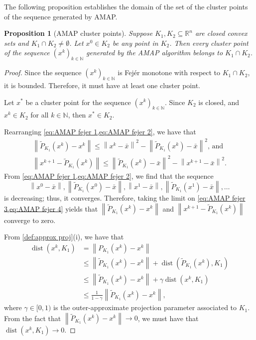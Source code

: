 \documentclass[smallextended,numbook,nospthms]{svjour3}
\theoremstyle{plain}
\newtheorem{proposition}[theorem]{Proposition}
\theoremstyle{definition}
\def\RR{\mathds R}
\def\NN{\mathds N}
\DeclareMathOperator{\dist}{dist}
\begin{document}
The following proposition establishes the domain of the set of the cluster points of the sequence generated by AMAP.
\begin{proposition}[AMAP cluster points]\label{prop:AMAP cluster}
	Suppose $K_{1},K_{2} \subseteq \RR^{n}$ are closed convex sets and $K_{1} \cap K_{2} \neq \emptyset$. Let $x^{0} \in K_{2}$ be any point in $K_{2}$. Then every cluster point of the sequence $\left(x^{k}\right)_{k \in \NN}$ generated by the AMAP algorithm belongs to $K_{1} \cap K_{2}$.
\end{proposition}
	\begin{proof}
	Since the sequence $\left(x^{k}\right)_{k \in \NN}$ is Fejér monotone with respect to $K_{1} \cap K_{2}$, it is bounded. Therefore, it must have at least one cluster point.
	
	Let $x^{*}$ be a cluster point for the sequence $\left(x^{k}\right)_{k \in \NN}$. Since $K_{2}$ is closed, and $x^{k} \in K_{2}$ for all $k \in \NN$, then $x^{*} \in K_{2}$.
	
	Rearranging \cref{eq:AMAP fejer 1,eq:AMAP fejer 2}, we have that
	\begin{align}
	\left\|\tilde{P}_{K_{1}}\left(x^{k}\right)-x^{k}\right\| \leq  \left\|x^{k}-\bar{x}\right\|^{2} - \left\|\tilde{P}_{K_{1}}\left(x^{k}\right)-\bar{x}\right\|^{2} \label{eq:AMAP fejer 3} \text{, and} \\
	\left\|x^{k+1}-\tilde{P}_{K_{1}}\left(x^{k}\right)\right\| \leq \left\|\tilde{P}_{K_{1}}\left(x^{k}\right)-\bar{x}\right\|^{2} - \left\|x^{k+1}-\bar{x}\right\|^{2}. \label{eq:AMAP fejer 4}
	\end{align}
	From \cref{eq:AMAP fejer 1,eq:AMAP fejer 2}, we find that the sequence
	$$
	\left\|x^{0}-\bar{x}\right\|,\left\|\tilde{P}_{K_{1}}\left(x^{0}\right)-\bar{x}\right\|,\left\|x^{1}-\bar{x}\right\|,\left\|\tilde{P}_{K_{1}}\left(x^{1}\right)-\bar{x}\right\|, \ldots
	$$
	is decreasing; thus, it converges. Therefore, taking the limit on  \cref{eq:AMAP fejer 3,eq:AMAP fejer 4} yields that $\left\|\tilde{P}_{K_{1}}\left(x^{k}\right)-x^{k}\right\|$ and $\left\|x^{k+1}-\tilde{P}_{K_{1}}\left(x^{k}\right)\right\|$ converge to zero.
	
	From \cref{def:approx proj}(i), we have that
	\begin{align}			
		\dist(x^{k},K_{1})&=\left\|P_{K_{1}}(x^{k})-x^{k}\right\|\\
		&\leq\left\|\tilde{P}_{K_{1}}\left(x^{k}\right)-x^{k}\right\|+\dist\left(\tilde{P}_{K_{1}}\left(x^{k}\right),K_{1}\right)\\
		&\leq\left\|\tilde{P}_{K_{1}}\left(x^{k}\right)-x^{k}\right\|+\gamma\dist(x^{k},K_{1}) \\
		&\leq \frac{1}{1-\gamma}\left\|\tilde{P}_{K_{1}}\left(x^{k}\right)-x^{k}\right\|, 
	\end{align}
where $\gamma \in [0,1)$ is the outer-approximate projection parameter associated to $K_{1}$. From the fact that $\left\|\tilde{P}_{K_{1}}\left(x^{k}\right)-x^{k}\right\| \rightarrow 0$, we must have that $\dist(x^{k},K_{1}) \rightarrow 0$.


\end{proof}
\end{document}
